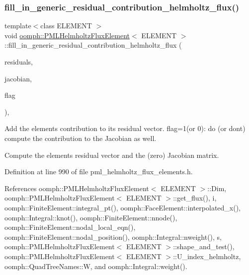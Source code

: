 \subsubsection{\texorpdfstring{fill\+\_\+in\+\_\+generic\+\_\+residual\+\_\+contribution\+\_\+helmholtz\+\_\+flux()}{fill\_in\_generic\_residual\_contribution\_helmholtz\_flux()}}
{\footnotesize\ttfamily template$<$class E\+L\+E\+M\+E\+NT $>$ \\
void \hyperlink{classoomph_1_1PMLHelmholtzFluxElement}{oomph\+::\+P\+M\+L\+Helmholtz\+Flux\+Element}$<$ E\+L\+E\+M\+E\+NT $>$\+::fill\+\_\+in\+\_\+generic\+\_\+residual\+\_\+contribution\+\_\+helmholtz\+\_\+flux (\begin{DoxyParamCaption}\item[{\hyperlink{classoomph_1_1Vector}{Vector}$<$ double $>$ \&}]{residuals,  }\item[{\hyperlink{classoomph_1_1DenseMatrix}{Dense\+Matrix}$<$ double $>$ \&}]{jacobian,  }\item[{const unsigned \&}]{flag }\end{DoxyParamCaption})\hspace{0.3cm}{\ttfamily [protected]}, {\ttfamily [virtual]}}



Add the element\textquotesingle{}s contribution to its residual vector. flag=1(or 0)\+: do (or don\textquotesingle{}t) compute the contribution to the Jacobian as well. 

Compute the element\textquotesingle{}s residual vector and the (zero) Jacobian matrix. 

Definition at line 990 of file pml\+\_\+helmholtz\+\_\+flux\+\_\+elements.\+h.



References oomph\+::\+P\+M\+L\+Helmholtz\+Flux\+Element$<$ E\+L\+E\+M\+E\+N\+T $>$\+::\+Dim, oomph\+::\+P\+M\+L\+Helmholtz\+Flux\+Element$<$ E\+L\+E\+M\+E\+N\+T $>$\+::get\+\_\+flux(), i, oomph\+::\+Finite\+Element\+::integral\+\_\+pt(), oomph\+::\+Face\+Element\+::interpolated\+\_\+x(), oomph\+::\+Integral\+::knot(), oomph\+::\+Finite\+Element\+::nnode(), oomph\+::\+Finite\+Element\+::nodal\+\_\+local\+\_\+eqn(), oomph\+::\+Finite\+Element\+::nodal\+\_\+position(), oomph\+::\+Integral\+::nweight(), s, oomph\+::\+P\+M\+L\+Helmholtz\+Flux\+Element$<$ E\+L\+E\+M\+E\+N\+T $>$\+::shape\+\_\+and\+\_\+test(), oomph\+::\+P\+M\+L\+Helmholtz\+Flux\+Element$<$ E\+L\+E\+M\+E\+N\+T $>$\+::\+U\+\_\+index\+\_\+helmholtz, oomph\+::\+Quad\+Tree\+Names\+::W, and oomph\+::\+Integral\+::weight().



